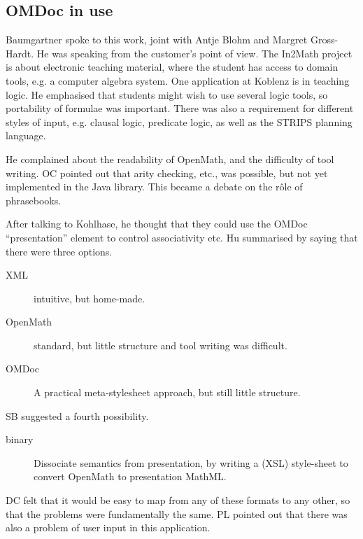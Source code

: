 \documentclass[11pt, a4paper]{article}
\begin{document}
\subsection{OMDoc in use}
Baumgartner spoke to this work, joint with Antje Blohm and Margret
Gross-Hardt. He was speaking from the customer's point of view. The In2Math
project is about electronic teaching material, where the student has access
to domain tools, e.g. a computer algebra system. One application at Koblenz
is in teaching logic. He emphasised that students might wish to use several
logic tools, so portability of formulae was important. There was also a
requirement for different styles of input, e.g. clausal logic, predicate
logic, as well as the STRIPS planning language.
\par
He complained about the readability of OpenMath, and the difficulty of tool
writing. OC pointed out that arity checking, etc., was possible, but not
yet implemented in the Java library. This became a debate on the r\^ole of
phrasebooks.
\par
After talking to Kohlhase, he thought that they could use the OMDoc
``presentation'' element to control associativity etc.
Hu summarised by saying that there were three options.
\begin{description}
\item[XML]intuitive, but home-made.
\item[OpenMath]standard, but little structure and tool writing was difficult.
\item[OMDoc]A practical meta-stylesheet approach, but still little
structure.
\end{description}
SB suggested a fourth possibility.
\begin{description}
\item[binary]Dissociate semantics from presentation, by writing a (XSL)
style-sheet to convert OpenMath to presentation MathML.
\end{description}
DC felt that it would be easy to map from any of these formats to any
other, so that the problems were fundamentally the same. PL pointed out
that there was also a problem of user input in this application.
\end{document}

